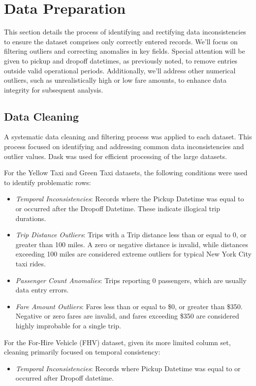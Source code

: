 \documentclass[conference]{IEEEtran}
\begin{document}
\section{Data Preparation}

This section details the process of identifying and rectifying data inconsistencies to ensure the dataset comprises only
correctly entered records. We'll focus on filtering outliers and correcting anomalies in key fields. Special attention
will be given to pickup and dropoff datetimes, as previously noted, to remove entries outside valid operational periods.
Additionally, we'll address other numerical outliers, such as unrealistically high or low fare amounts, to enhance data
integrity for subsequent analysis.

\subsection{Data Cleaning}
A systematic data cleaning and filtering process was applied to each dataset. This process focused on identifying and
addressing common data inconsistencies and outlier values. Dask was used for efficient processing of the large datasets.

For the Yellow Taxi and Green Taxi datasets, the following conditions were used to identify problematic rows:
\begin{itemize}
  \item \emph{Temporal Inconsistencies}: Records where the Pickup Datetime was equal to or occurred after the
    Dropoff Datetime. These indicate illogical trip durations.
  \item \emph{Trip Distance Outliers}: Trips with a Trip distance less than or equal to 0, or greater than 100 miles. A
    zero or negative distance is invalid, while distances exceeding 100 miles are considered extreme outliers for
    typical New York City taxi rides.
  \item \emph{Passenger Count Anomalies}: Trips reporting 0 passengers, which are usually data entry errors.
  \item \emph{Fare Amount Outliers}: Fares less than or equal to \$0, or greater than \$350. Negative or zero fares are
    invalid, and fares exceeding \$350 are considered highly improbable for a single trip.
\end{itemize}

For the For-Hire Vehicle (FHV) dataset, given its more limited column set, cleaning primarily focused on temporal consistency:
\begin{itemize}
  \item \emph{Temporal Inconsistencies}: Records where Pickup Datetime was equal to or occurred after Dropoff datetime.
\end{itemize}
\end{document}
